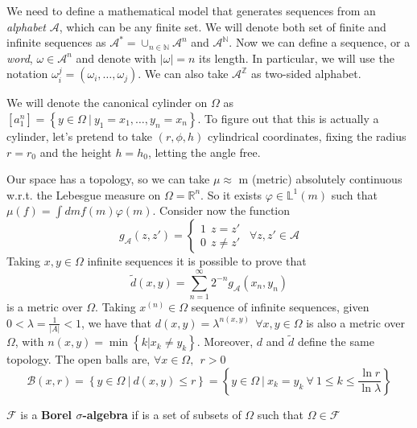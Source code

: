 We need to define a mathematical model that generates sequences from an \emph{alphabet} $\mathcal{A}$, which can be any finite set.
We will denote both set of finite and infinite sequences as $\mathcal{A}^{*} = \cup_{n \in \mathbb{N}} \mathcal{A}^n$ and $\mathcal{A}^\mathbb{N}$.
Now we can define a sequence, or a \emph{word}, $\omega \in \mathcal{A}^n$ and denote with $\left\lvert \omega \right\rvert = n$ its length.
In particular, we will use the notation $\omega_i^j = \left(\omega_i, \ldots, \omega_j\right)$.
We can also take $\mathcal{A}^\mathbb{Z}$ as two-sided alphabet.

We will denote the canonical cylinder on $\Omega$ as $\left[a_1^n\right] = \left\{y \in \Omega \ \vert \ y_1 = x_1, \ldots, y_n = x_n\right\}$.
To figure out that this is actually a cylinder, let's pretend to take $\left(r, \phi, h\right)$ cylindrical coordinates, fixing the radius $r = r_0$ and the height $h = h_0$, letting the angle free.

Our space has a topology, so we can take $\mu \approx$ m (metric) absolutely continuous w.r.t. the Lebesgue measure on $\Omega = \mathbb{R}^n$.
So it exists $\varphi \in \mathbb{L}^1(m)$ such that $\mu(f) = \int dm f(m)\varphi(m)$.
Consider now the function
\begin{equation*}
    g_\mathcal{A}\left(z, z'\right) =
    \begin{cases}
        1 \ \ z = z' \\
        0 \ \ z \neq z'
    \end{cases}
    \ \ \forall z, z' \in \mathcal{A}
\end{equation*}
Taking $x, y \in \Omega$ infinite sequences it is possible to prove that
\begin{equation*}
    \widetilde{d}\left(x, y\right) = \sum_{n=1}^\infty 2^{-n} g_\mathcal{A}\left(x_n, y_n\right)
\end{equation*}
is a metric over $\Omega$.
Taking $x^{(n)} \in \Omega$ sequence of infinite sequences, given $0 < \lambda = \frac{1}{\left\lvert A\right\rvert} < 1$, we have that $d(x, y) = \lambda^{n\left(x, y\right)} \ \ \forall x, y \in \Omega$ is also a metric over $\Omega$, with $n(x, y) = \min\left\{k \vert x_k \neq y_k\right\}$.
Moreover, $d$ and $\widetilde{d}$ define the same topology.
The open balls are, $\forall x \in \Omega, \ \ r > 0$
\begin{equation*}
    \mathcal{B}\left(x, r\right) =  \left\{y \in \Omega \ \vert \ d(x, y) \leq r\right\} = \left\{y \in \Omega \ \vert \ x_k = y_k \ \forall \ 1 \leq k \leq \frac{\ln r}{\ln \lambda}\right\}
\end{equation*}
\begin{definition}
    $\mathcal{F}$ is a \textbf{Borel $\sigma$-algebra} if is a set of subsets of $\Omega$ such that $\Omega \in \mathcal{F}$
\end{definition}